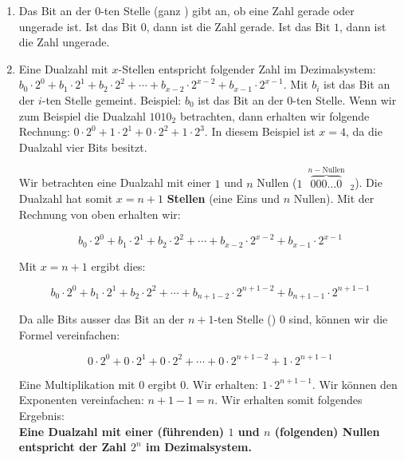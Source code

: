 \begin{enumerate}

\item Das Bit an der $0$-ten Stelle (ganz ) gibt an, ob eine Zahl gerade oder ungerade ist. Ist das Bit $0$, dann ist die Zahl gerade. Ist das  Bit $1$, dann ist die Zahl ungerade.

\item Eine Dualzahl mit $x$-Stellen entspricht folgender Zahl im Dezimalsystem: $b_0 \cdot 2^0 + b_1 \cdot 2^1 + b_2 \cdot 2^2 + \cdots + b_{x-2} \cdot 2^{x-2} + b_{x-1} \cdot 2^{x-1}$. Mit $b_i$ ist das Bit an der $i$-ten Stelle gemeint. Beispiel: $b_0$ ist das Bit an der $0$-ten Stelle. Wenn wir zum Beispiel die Dualzahl $1010_2$ betrachten, dann erhalten wir folgende Rechnung: $0 \cdot 2^0 + 1 \cdot 2^1 + 0 \cdot 2^2 + 1 \cdot 2^3$. In diesem Beispiel ist $x = 4$, da die Dualzahl vier Bits besitzt.

Wir betrachten eine Dualzahl mit einer $1$ und $n$ Nullen ($1$~$\overbrace{000\dots0}^{n-\textrm{Nullen}}$~$_2$). Die Dualzahl hat somit $x = n + 1$ \textbf{Stellen} (eine Eins und $n$ Nullen). Mit der Rechnung von oben erhalten wir:

\begin{equation*}
b_0 \cdot 2^0 + b_1 \cdot 2^1 + b_2 \cdot 2^2 + \cdots + b_{x-2} \cdot 2^{x-2} + b_{x-1} \cdot 2^{x-1}
\end{equation*}

Mit $x = n + 1$ ergibt dies:

\begin{equation*}
b_0 \cdot 2^0 + b_1 \cdot 2^1 + b_2 \cdot 2^2 + \cdots + b_{n+1-2} \cdot 2^{n+1-2} + b_{n+1-1} \cdot 2^{n+1-1}
\end{equation*}

Da alle Bits ausser das Bit an der $n+1$-ten Stelle () $0$ sind, können wir die Formel vereinfachen:

\begin{equation*}
0 \cdot 2^0 + 0 \cdot 2^1 + 0 \cdot 2^2 + \cdots + 0 \cdot 2^{n+1-2} + 1 \cdot 2^{n+1-1}
\end{equation*}

Eine Multiplikation mit $0$ ergibt $0$. Wir erhalten: $1 \cdot 2^{n+1-1}$. Wir können den Exponenten vereinfachen: $n+1-1 = n$. Wir erhalten somit folgendes Ergebnis:\\

\textbf{Eine Dualzahl mit einer (führenden) $1$ und $n$ (folgenden) Nullen entspricht der Zahl $2^n$ im Dezimalsystem.}\\


\end{enumerate}
